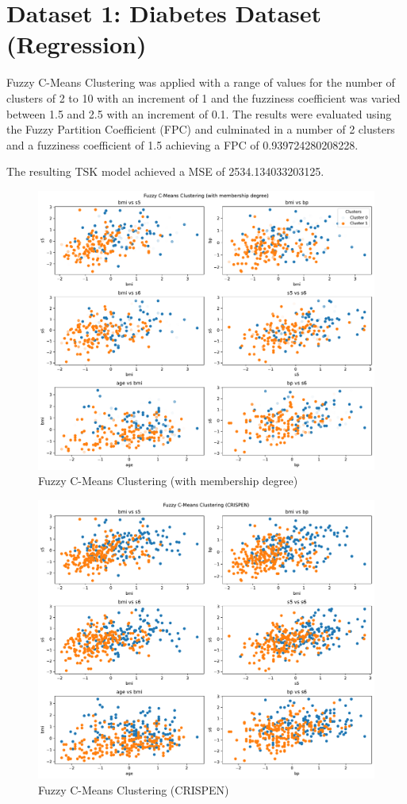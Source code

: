 \section{Dataset 1: Diabetes Dataset (Regression)}

Fuzzy C-Means Clustering was applied with a range of values for the number of clusters of 2 to 10 with an increment of 1 and the fuzziness coefficient was varied between 1.5 and 2.5 with an increment of 0.1. The results were evaluated using the Fuzzy Partition Coefficient (FPC) and culminated in a number of 2 clusters and a fuzziness coefficient of 1.5 achieving a FPC of 0.939724280208228.

The resulting TSK model achieved a MSE of 2534.134033203125.

\begin{figure}[h!]
    \centering
    \includegraphics[width=1\textwidth]{Plots/Fuzzy C-Means Clustering (with membership degree) REG.pdf}
    \caption{Fuzzy C-Means Clustering (with membership degree)}
    \label{fig:my_label}
\end{figure}

\begin{figure}[h!]
    \centering
    \includegraphics[width=1\textwidth]{Plots/Fuzzy C-Means Clustering (CRISPEN) REG.pdf}
    \caption{Fuzzy C-Means Clustering (CRISPEN)}
    \label{fig:my_label}
\end{figure}